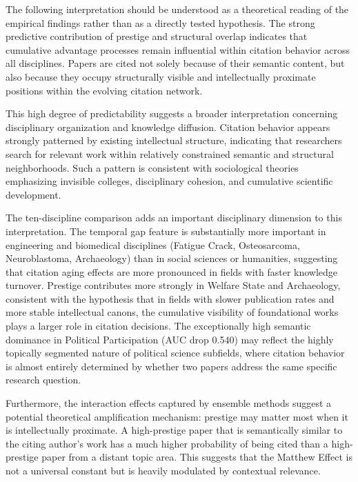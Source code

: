 \documentclass[11pt,a4paper]{article}
\begin{document}
The following interpretation should be understood as a theoretical reading of the empirical findings rather than as a directly tested hypothesis. The strong predictive contribution of prestige and structural overlap indicates that cumulative advantage processes remain influential within citation behavior across all disciplines. Papers are cited not solely because of their semantic content, but also because they occupy structurally visible and intellectually proximate positions within the evolving citation network.

This high degree of predictability suggests a broader interpretation concerning disciplinary organization and knowledge diffusion. Citation behavior appears strongly patterned by existing intellectual structure, indicating that researchers search for relevant work within relatively constrained semantic and structural neighborhoods. Such a pattern is consistent with sociological theories emphasizing invisible colleges, disciplinary cohesion, and cumulative scientific development.

The ten-discipline comparison adds an important disciplinary dimension to this interpretation. The temporal gap feature is substantially more important in engineering and biomedical disciplines (Fatigue Crack, Osteosarcoma, Neuroblastoma, Archaeology) than in social sciences or humanities, suggesting that citation aging effects are more pronounced in fields with faster knowledge turnover. Prestige contributes more strongly in Welfare State and Archaeology, consistent with the hypothesis that in fields with slower publication rates and more stable intellectual canons, the cumulative visibility of foundational works plays a larger role in citation decisions. The exceptionally high semantic dominance in Political Participation (AUC drop 0.540) may reflect the highly topically segmented nature of political science subfields, where citation behavior is almost entirely determined by whether two papers address the same specific research question.

Furthermore, the interaction effects captured by ensemble methods suggest a potential theoretical amplification mechanism: prestige may matter most when it is intellectually proximate. A high-prestige paper that is semantically similar to the citing author's work has a much higher probability of being cited than a high-prestige paper from a distant topic area. This suggests that the Matthew Effect is not a universal constant but is heavily modulated by contextual relevance.
\end{document}
